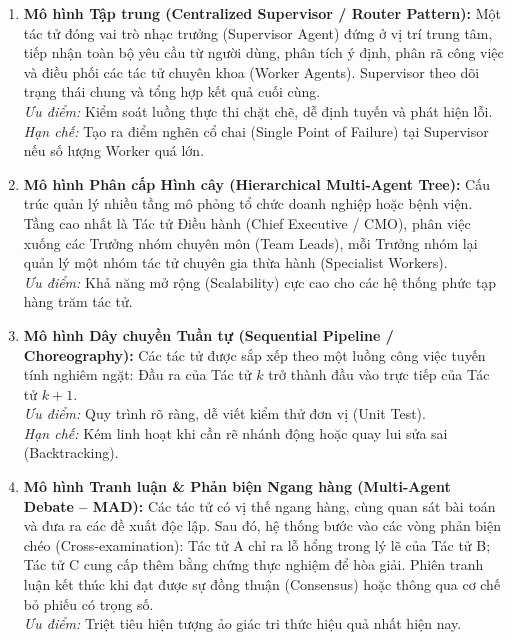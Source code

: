 \documentclass[12pt,a4paper]{report}
\begin{document}
\begin{enumerate}[leftmargin=1.2cm]
    \item \textbf{Mô hình Tập trung (Centralized Supervisor / Router Pattern):} Một tác tử đóng vai trò nhạc trưởng (Supervisor Agent) đứng ở vị trí trung tâm, tiếp nhận toàn bộ yêu cầu từ người dùng, phân tích ý định, phân rã công việc và điều phối các tác tử chuyên khoa (Worker Agents). Supervisor theo dõi trạng thái chung và tổng hợp kết quả cuối cùng. \\
    \textit{Ưu điểm:} Kiểm soát luồng thực thi chặt chẽ, dễ định tuyến và phát hiện lỗi. \\
    \textit{Hạn chế:} Tạo ra điểm nghẽn cổ chai (Single Point of Failure) tại Supervisor nếu số lượng Worker quá lớn.
    
    \item \textbf{Mô hình Phân cấp Hình cây (Hierarchical Multi-Agent Tree):} Cấu trúc quản lý nhiều tầng mô phỏng tổ chức doanh nghiệp hoặc bệnh viện. Tầng cao nhất là Tác tử Điều hành (Chief Executive / CMO), phân việc xuống các Trưởng nhóm chuyên môn (Team Leads), mỗi Trưởng nhóm lại quản lý một nhóm tác tử chuyên gia thừa hành (Specialist Workers). \\
    \textit{Ưu điểm:} Khả năng mở rộng (Scalability) cực cao cho các hệ thống phức tạp hàng trăm tác tử.
    
    \item \textbf{Mô hình Dây chuyền Tuần tự (Sequential Pipeline / Choreography):} Các tác tử được sắp xếp theo một luồng công việc tuyến tính nghiêm ngặt: Đầu ra của Tác tử $k$ trở thành đầu vào trực tiếp của Tác tử $k+1$. \\
    \textit{Ưu điểm:} Quy trình rõ ràng, dễ viết kiểm thử đơn vị (Unit Test). \\
    \textit{Hạn chế:} Kém linh hoạt khi cần rẽ nhánh động hoặc quay lui sửa sai (Backtracking).
    
    \item \textbf{Mô hình Tranh luận \& Phản biện Ngang hàng (Multi-Agent Debate -- MAD):} Các tác tử có vị thế ngang hàng, cùng quan sát bài toán và đưa ra các đề xuất độc lập. Sau đó, hệ thống bước vào các vòng phản biện chéo (Cross-examination): Tác tử A chỉ ra lỗ hổng trong lý lẽ của Tác tử B; Tác tử C cung cấp thêm bằng chứng thực nghiệm để hòa giải. Phiên tranh luận kết thúc khi đạt được sự đồng thuận (Consensus) hoặc thông qua cơ chế bỏ phiếu có trọng số. \\
    \textit{Ưu điểm:} Triệt tiêu hiện tượng ảo giác tri thức hiệu quả nhất hiện nay.
\end{enumerate}
\end{document}
